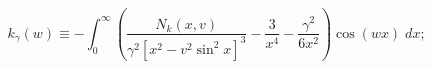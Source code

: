 \begin{equation} 
\label{hsE} 
k_{\gamma}(w)\equiv - 
\int _{0}^{\infty}\left(\frac{N_k(x,v)}{\gamma ^2[x^2-v^2\sin ^2 x]^3} 
-\frac{3}{x^4}-\frac{\gamma ^2}{6x^2}\right) 
\cos (wx)\; d x; 
\end{equation} 
